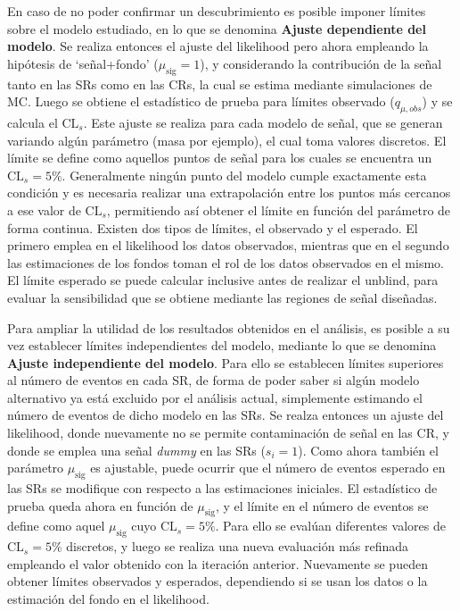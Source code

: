 En caso de no poder confirmar un descubrimiento es posible imponer límites sobre el modelo estudiado, en lo que se denomina \textbf{Ajuste dependiente del modelo}. 
Se realiza entonces el ajuste del likelihood pero ahora empleando la hipótesis de `señal+fondo' ($\mu_\text{sig}=1$), y considerando la contribución de la señal tanto en las SRs como en las CRs, la cual se estima mediante simulaciones de MC. Luego se obtiene el estadístico de prueba para límites observado ($q_{\mu, obs}$) y se calcula el $\text{CL}_{s}$. Este ajuste se realiza para cada modelo de señal, que se generan variando algún parámetro (masa por ejemplo), el cual toma valores discretos. El límite se define como aquellos puntos de señal para los cuales se encuentra un $\text{CL}_{s}=5\%$. Generalmente ningún punto del modelo cumple exactamente esta condición y es necesaria realizar una extrapolación entre los puntos más cercanos a ese valor de $\text{CL}_{s}$, permitiendo así obtener el límite en función del parámetro de forma continua. Existen dos tipos de límites, el observado y el esperado. El primero emplea en el likelihood los datos observados, mientras que en el segundo las estimaciones de los fondos toman el rol de los datos observados en el mismo. El límite esperado se puede calcular inclusive antes de realizar el unblind, para evaluar la sensibilidad que se obtiene mediante las regiones de señal diseñadas.

Para ampliar la utilidad de los resultados obtenidos en el análisis, es posible a su vez establecer límites independientes del modelo, mediante lo que se denomina \textbf{Ajuste independiente del modelo}. Para ello se establecen límites superiores al número de eventos en cada SR, de forma de poder saber si algún modelo alternativo ya está excluido por el análisis actual, simplemente estimando el número de eventos de dicho modelo en las SRs. Se realza entonces un ajuste del likelihood, donde nuevamente no se permite contaminación de señal en las CR, y donde se emplea una señal \textit{dummy} en las SRs ($s_i=1$). Como ahora también el parámetro $\mu_\text{sig}$ es ajustable, puede ocurrir que el número de eventos esperado en las SRs se modifique con respecto a las estimaciones iniciales. El estadístico de prueba queda ahora en función de $\mu_\text{sig}$, y el límite en el número de eventos se define como aquel $\mu_\text{sig}$ cuyo $\text{CL}_{s}=5\%$. Para ello se evalúan diferentes valores de $\text{CL}_{s}=5\%$ discretos, y luego se realiza una nueva evaluación más refinada empleando el valor obtenido con la iteración anterior. Nuevamente se pueden obtener límites observados y esperados, dependiendo si se usan los datos o la estimación del fondo en el likelihood.


